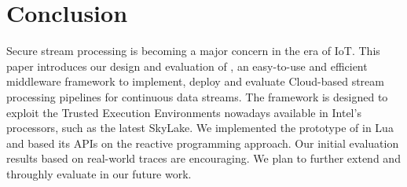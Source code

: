 \section{Conclusion}
\label{sec:conclusion}
Secure stream processing is becoming a major concern in the era of IoT.
This paper introduces our design and evaluation of \SYS, an easy-to-use and efficient middleware framework to implement, deploy and evaluate Cloud-based stream processing pipelines for continuous data streams.
The framework is designed to exploit the Trusted Execution Environments nowadays available in Intel's processors, such as the latest SkyLake.
We implemented the prototype of \SYS in Lua and based its APIs on the reactive programming approach.
Our initial evaluation results based on real-world traces are encouraging.
We plan to further extend and throughly evaluate \SYS in our future work.
